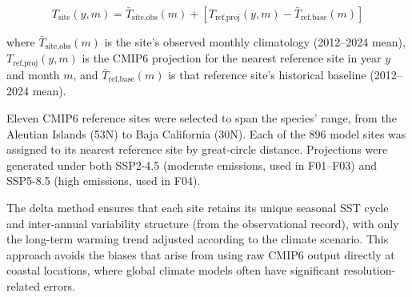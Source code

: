 \begin{equation}
T_{\text{site}}(y, m) = \bar{T}_{\text{site,obs}}(m) + \left[ T_{\text{ref,proj}}(y, m) - \bar{T}_{\text{ref,base}}(m) \right]
\label{eq:delta}
\end{equation}

\noindent where $\bar{T}_{\text{site,obs}}(m)$ is the site's observed monthly climatology (2012--2024 mean), $T_{\text{ref,proj}}(y, m)$ is the CMIP6 projection for the nearest reference site in year $y$ and month $m$, and $\bar{T}_{\text{ref,base}}(m)$ is that reference site's historical baseline (2012--2024 mean).

Eleven CMIP6 reference sites were selected to span the species' range, from the Aleutian Islands (53\textdegree N) to Baja California (30\textdegree N). Each of the 896 model sites was assigned to its nearest reference site by great-circle distance. Projections were generated under both SSP2-4.5 (moderate emissions, used in F01--F03) and SSP5-8.5 (high emissions, used in F04).

The delta method ensures that each site retains its unique seasonal SST cycle and inter-annual variability structure (from the observational record), with only the long-term warming trend adjusted according to the climate scenario. This approach avoids the biases that arise from using raw CMIP6 output directly at coastal locations, where global climate models often have significant resolution-related errors.
